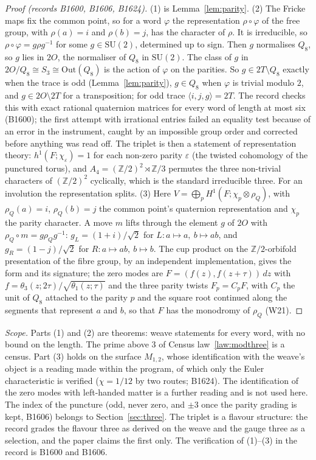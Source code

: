 \begin{proof}[Proof (records B1600, B1606, B1624)]
(1) is Lemma~\ref{lem:parity}. (2) The Fricke maps fix the common point, so for a word $\varphi$ the representation $\rho\circ\varphi$ of the free
group, with $\rho(a)=i$ and $\rho(b)=j$, has the character of $\rho$. It is irreducible, so $\rho\circ\varphi=g\rho g^{-1}$
for some $g\in\mathrm{SU}(2)$, determined up to sign. Then $g$ normalises $Q_8$, so $g$ lies in $2O$, the normaliser of
$Q_8$ in $\mathrm{SU}(2)$. The class of $g$ in $2O/Q_8\cong S_3\cong\mathrm{Out}(Q_8)$ is the action of $\varphi$ on the parities.
So $g\in2T\setminus Q_8$ exactly when the trace is odd (Lemma~\ref{lem:parity}), $g\in Q_8$ when $\varphi$ is trivial
modulo $2$, and $g\in2O\setminus2T$ for a transposition; for odd trace $\langle i,j,g\rangle=2T$. The record checks this with
exact rational quaternion matrices for every word of length at most six (B1600); the first attempt with irrational entries
failed an equality test because of an error in the instrument, caught by an impossible group order and corrected before
anything was read off. The triplet is then a statement of representation theory:
$h^1(F;\chi_\varepsilon)=1$ for each non-zero parity $\varepsilon$ (the twisted cohomology of the punctured torus), and
$A_4=(\mathbb{Z}/2)^2\rtimes\mathbb{Z}/3$ permutes the three non-trivial characters of $(\mathbb{Z}/2)^2$ cyclically,
which is the standard irreducible three. For an involution the representation splits. (3) Here $V=\bigoplus_p H^1(F;\chi_p\otimes\rho_Q)$, with $\rho_Q(a)=i$, $\rho_Q(b)=j$ the
common point's quaternion representation and $\chi_p$ the parity character. A move $m$ lifts through the element $g$ of
$2O$ with $\rho_Q\circ m=g\rho_Q g^{-1}$: $g_L=(1+i)/\sqrt2$ for $L\colon a\mapsto a,\ b\mapsto ab$, and
$g_R=(1-j)/\sqrt2$ for $R\colon a\mapsto ab,\ b\mapsto b$. The cup product on the
$\mathbb{Z}/2$-orbifold presentation of the fibre group, by an independent implementation, gives the form and its
signature; the zero modes are $F=(f(z),f(z+\tau))\,dz$ with $f=\theta_3(z;2\tau)/\sqrt{\theta_1(z;\tau)}$ and the three
parity twists $F_p=C_pF$, with $C_p$ the unit of $Q_8$ attached to the parity $p$ and the square root continued along
the segments that represent $a$ and $b$, so that $F$ has the monodromy of $\rho_Q$ (W21).
\end{proof}

\noindent\emph{Scope.} Parts (1) and (2) are theorems: weave statements for every word, with no bound on the length. The
prime above $3$ of Census law~\ref{law:modthree} is a census. Part (3) holds on the
surface $M_{1,2}$, whose identification with the weave's object is a reading made within the program, of which only the
Euler characteristic is verified ($\chi=1/12$ by two routes; B1624). The identification of the zero modes with
left-handed matter is a further reading and is not used here. The index of the puncture (odd, never zero, and $\pm3$
once the parity grading is kept, B1606) belongs to Section~\ref{sec:three}. The triplet is a flavour structure: the
record grades the flavour three as derived on the weave and the gauge three as a selection, and the paper claims the first
only. The verification of (1)--(3) in the record is B1600 and B1606.

